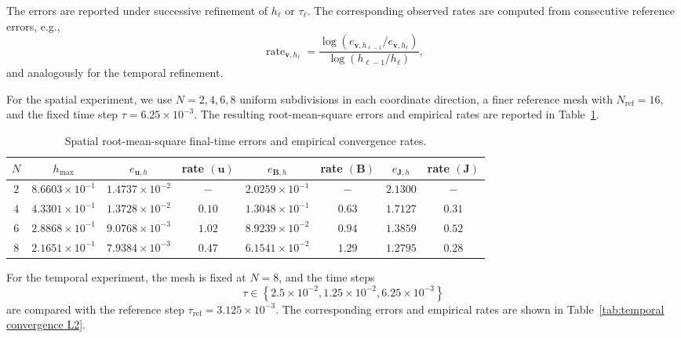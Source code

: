 \documentclass[11pt, reqno]{amsart}
\theoremstyle{definition}
\numberwithin{equation}{section}
\newcommand{\bff}{\boldsymbol}
\begin{document}
The errors are reported under successive refinement of $h_\ell$ or
$\tau_\ell$. The corresponding observed rates are computed from consecutive
reference errors, e.g.,
\[
\operatorname{rate}_{\bff v,h_\ell}
=
\frac{
	\log(e_{\bff v,h_{\ell-1}}/e_{\bff v,h_\ell})
}{
	\log(h_{\ell-1}/h_\ell)
},
\]
and analogously for the temporal refinement.

For the spatial experiment, we use $N=2,4,6,8$ uniform subdivisions in
each coordinate direction, a finer reference mesh with
$N_{\mathrm{ref}}=16$, and the fixed time step
$\tau=6.25\times10^{-3}$. The resulting root-mean-square errors and
empirical rates are reported in Table~\ref{tab:spatial convergence L2}.

\begin{table}[htbp]
	\centering
	\small
	\caption{Spatial root-mean-square final-time errors and empirical
		convergence rates.}
	\label{tab:spatial convergence L2}
	\begin{tabular}{c c c c c c c c}
		\hline
		$N$
		&
		$h_{\max}$
		&
		$e_{\bff u,h}$
		&
		rate $(\bff u)$
		&
		$e_{\bff B,h}$
		&
		rate $(\bff B)$
		&
		$e_{\bff J,h}$
		&
		rate $(\bff J)$
		\\
		\hline
		$2$
		&
		$8.6603\times10^{-1}$
		&
		$1.4737\times10^{-2}$
		&
		$-$
		&
		$2.0259\times10^{-1}$
		&
		$-$
		&
		$2.1300$
		&
		$-$
		\\
		$4$
		&
		$4.3301\times10^{-1}$
		&
		$1.3728\times10^{-2}$
		&
		$0.10$
		&
		$1.3048\times10^{-1}$
		&
		$0.63$
		&
		$1.7127$
		&
		$0.31$
		\\
		$6$
		&
		$2.8868\times10^{-1}$
		&
		$9.0768\times10^{-3}$
		&
		$1.02$
		&
		$8.9239\times10^{-2}$
		&
		$0.94$
		&
		$1.3859$
		&
		$0.52$
		\\
		$8$
		&
		$2.1651\times10^{-1}$
		&
		$7.9384\times10^{-3}$
		&
		$0.47$
		&
		$6.1541\times10^{-2}$
		&
		$1.29$
		&
		$1.2795$
		&
		$0.28$
		\\
		\hline
	\end{tabular}
\end{table}

For the temporal experiment, the mesh is fixed at $N=8$, and the time
steps
\[
\tau
\in
\left\{
2.5\times10^{-2},
1.25\times10^{-2},
6.25\times10^{-3}
\right\}
\]
are compared with the reference step
$\tau_{\mathrm{ref}}=3.125\times10^{-3}$. The corresponding errors and
empirical rates are shown in Table~\ref{tab:temporal convergence L2}.
\end{document}
